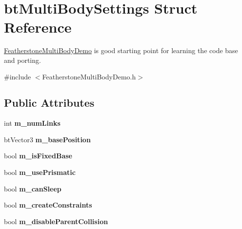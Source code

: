 \hypertarget{structbt_multi_body_settings}{\section{bt\+Multi\+Body\+Settings Struct Reference}
\label{structbt_multi_body_settings}
}


\hyperlink{class_featherstone_multi_body_demo}{Featherstone\+Multi\+Body\+Demo} is good starting point for learning the code base and porting.  




{\ttfamily \#include $<$Featherstone\+Multi\+Body\+Demo.\+h$>$}

\subsection*{Public Attributes}
\begin{DoxyCompactItemize}
\item 
\hypertarget{structbt_multi_body_settings_a033c0086541c550e26b8b790722cac39}{int {\bfseries m\+\_\+num\+Links}}\label{structbt_multi_body_settings_a033c0086541c550e26b8b790722cac39}

\item 
\hypertarget{structbt_multi_body_settings_ada208d8ad2fcdf08a135abbbbf3ce13d}{bt\+Vector3 {\bfseries m\+\_\+base\+Position}}\label{structbt_multi_body_settings_ada208d8ad2fcdf08a135abbbbf3ce13d}

\item 
\hypertarget{structbt_multi_body_settings_af71d77dd52aab90fd4efb8caa77809d9}{bool {\bfseries m\+\_\+is\+Fixed\+Base}}\label{structbt_multi_body_settings_af71d77dd52aab90fd4efb8caa77809d9}

\item 
\hypertarget{structbt_multi_body_settings_a9e519b61689f879b685c84347b5356ce}{bool {\bfseries m\+\_\+use\+Prismatic}}\label{structbt_multi_body_settings_a9e519b61689f879b685c84347b5356ce}

\item 
\hypertarget{structbt_multi_body_settings_a14c5990a7ce8d43aba00d96e8a386ade}{bool {\bfseries m\+\_\+can\+Sleep}}\label{structbt_multi_body_settings_a14c5990a7ce8d43aba00d96e8a386ade}

\item 
\hypertarget{structbt_multi_body_settings_a5e84c0b9d106da02abb623386bd520fa}{bool {\bfseries m\+\_\+create\+Constraints}}\label{structbt_multi_body_settings_a5e84c0b9d106da02abb623386bd520fa}

\item 
\hypertarget{structbt_multi_body_settings_a0883ff1fc891e49e5c741c988ff28724}{bool {\bfseries m\+\_\+disable\+Parent\+Collision}}\label{structbt_multi_body_settings_a0883ff1fc891e49e5c741c988ff28724}

\end{DoxyCompactItemize}


